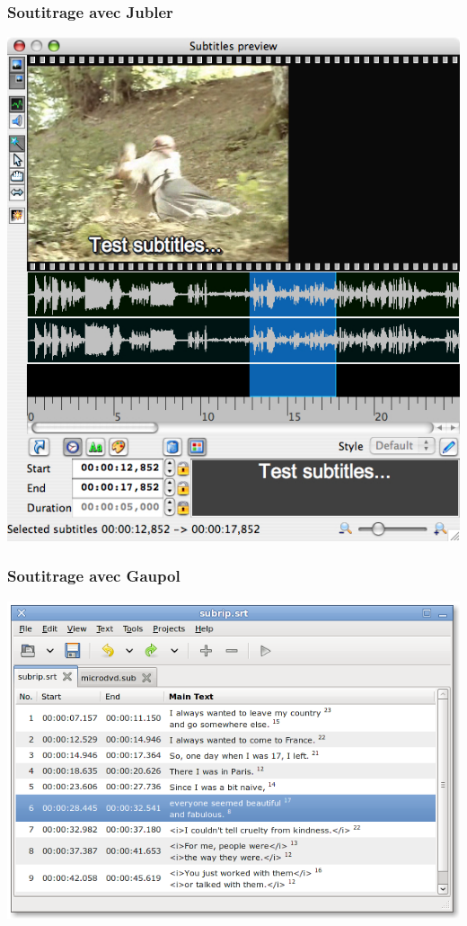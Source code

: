 \begin{frame}
 \frametitle{Soutitrage avec Jubler}
 \includegraphics[scale=0.30]{ressources/jubler.jpg}
 \end{frame} 

\begin{frame}
 \frametitle{Soutitrage avec Gaupol}
 \includegraphics[scale=0.35]{ressources/gaupol.png}
 \end{frame}

